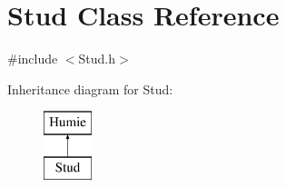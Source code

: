 \hypertarget{class_stud}{}\section{Stud Class Reference}
\label{class_stud}


{\ttfamily \#include $<$Stud.\+h$>$}

Inheritance diagram for Stud\+:\begin{figure}[H]
\begin{center}
\leavevmode
\includegraphics[height=2.000000cm]{class_stud}
\end{center}
\end{figure}
